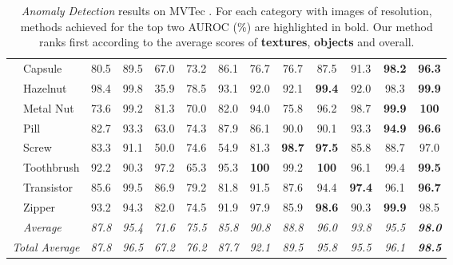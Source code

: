 \documentclass[10pt,twocolumn,letterpaper]{article}
\begin{document}
\begin{table*}[!ht]
\begin{tabular}{clccccccccccc}
\multicolumn{1}{c|}{} & \multicolumn{1}{l|}{Capsule} & 80.5 & \multicolumn{1}{c|}{89.5} & 67.0 & 73.2 & 86.1 & 76.7 & 76.7 & 87.5 & 91.3 & \textbf{98.2} & \textbf{96.3} \\
\multicolumn{1}{c|}{} & \multicolumn{1}{l|}{Hazelnut} & 98.4 & \multicolumn{1}{c|}{99.8} & 35.9 & 78.5 & 93.1 & 92.0 & 92.1 & \textbf{99.4} & 92.0 & 98.3 & \textbf{99.9} \\
\multicolumn{1}{c|}{} & \multicolumn{1}{l|}{Metal Nut} & 73.6 & \multicolumn{1}{c|}{99.2} & 81.3 & 70.0 & 82.0 & 94.0 & 75.8 & 96.2 & 98.7 & \textbf{99.9} & \textbf{100} \\
\multicolumn{1}{c|}{} & \multicolumn{1}{l|}{Pill} & 82.7 & \multicolumn{1}{c|}{93.3} & 63.0 & 74.3 & 87.9 & 86.1 & 90.0 & 90.1 & 93.3 & \textbf{94.9} & \textbf{96.6} \\ 
\multicolumn{1}{c|}{} & \multicolumn{1}{l|}{Screw} & 83.3 & \multicolumn{1}{c|}{91.1} & 50.0 & 74.6 & 54.9 & 81.3 & \textbf{98.7} & \textbf{97.5} & 85.8 & 88.7 & 97.0 \\ 
\multicolumn{1}{c|}{} & \multicolumn{1}{l|}{Toothbrush} & 92.2 & \multicolumn{1}{c|}{90.3} & 97.2 & 65.3 & 95.3 & \textbf{100} & 99.2 & \textbf{100} & 96.1 & 99.4 & \textbf{99.5} \\ 
\multicolumn{1}{c|}{} & \multicolumn{1}{l|}{Transistor} & 85.6 & \multicolumn{1}{c|}{99.5} & 86.9 & 79.2 & 81.8 & 91.5 & 87.6 & 94.4 & \textbf{97.4} & 96.1 & \textbf{96.7} \\ 
\multicolumn{1}{c|}{} & \multicolumn{1}{l|}{Zipper} & 93.2 & \multicolumn{1}{c|}{94.3} & 82.0 & 74.5 & 91.9 & 97.9 & 85.9 & \textbf{98.6} & 90.3 & \textbf{99.9} & 98.5 \\ \cline{2-13} 
\multicolumn{1}{c|}{} & \multicolumn{1}{l|}{\textit{Average}} & \textit{87.8} & \multicolumn{1}{c|}{\textit{95.4}} & \textit{71.6} & \textit{75.5} & \textit{85.8} & \textit{90.8} & \textit{88.8} & \textit{96.0} & \textit{93.8} & \textit{95.5} & \textit{\textbf{98.0}} \\ \hline
\multicolumn{2}{c}{\textit{Total Average}} & \textit{87.8} & \textit{96.5} & \textit{67.2} & \textit{76.2} & \textit{87.7} & \textit{92.1} & \textit{89.5} & \textit{95.8} & \textit{95.5} & \textit{96.1} & \textit{\textbf{98.5}} \\ \hline
\end{tabular}
\caption{\emph{Anomaly Detection} results on MVTec \cite{mvtec}. For each category with images of  resolution, methods achieved for the top two AUROC (\%) are highlighted in bold. Our method ranks first according to the average scores of {\bf textures}, {\bf objects} and overall.}\label{tab:ad}
\end{table*}
\end{document}
